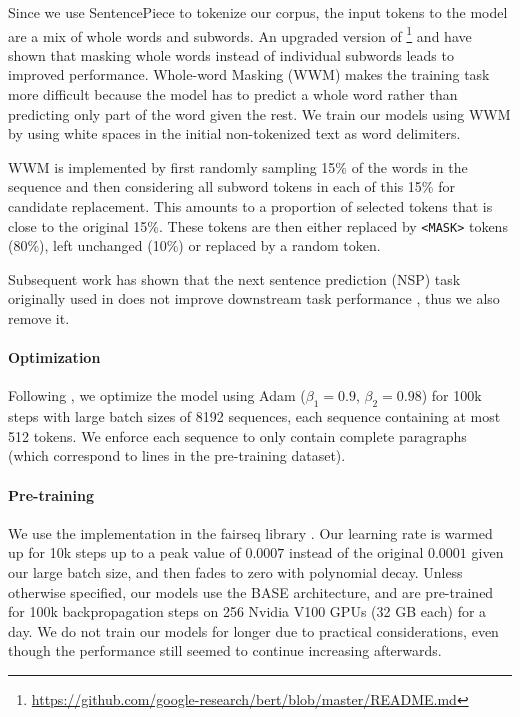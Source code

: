 Since we use SentencePiece to tokenize our corpus, the input tokens to the model are a mix of whole words and subwords. An upgraded version of \bert\footnote{\url{https://github.com/google-research/bert/blob/master/README.md}} and \citet{joshi-etal-2020-spanbert} have shown that masking whole words instead of individual subwords leads to improved performance. Whole-word Masking (WWM) makes the training task more difficult because the model has to predict a whole word rather than predicting only part of the word given the rest. We train our models using WWM by using white spaces in the initial non-tokenized text as word delimiters.

WWM is implemented by first randomly sampling 15\% of the words in the sequence and then considering all subword tokens in each of this 15\% for candidate replacement. This amounts to a proportion of selected tokens that is close to the original 15\%. These tokens are then either replaced by \texttt{<MASK>} tokens (80\%), left unchanged (10\%) or replaced by a random token.

Subsequent work has shown that the next sentence prediction (NSP) task originally used in \bert does not improve downstream task performance \citep{conneau-lample-2019-cross,liu-etal-2019-roberta}, thus we also remove it.

\paragraph{Optimization}
Following \citep{liu-etal-2019-roberta}, we optimize the model using Adam \citep{kingma-ba-2015-adam} ($\beta_1 = 0.9$, $\beta_2 = 0.98$) for 100k steps with large batch sizes of 8192 sequences, each sequence containing at most 512 tokens. We enforce each sequence to only contain complete paragraphs (which correspond to lines in the pre-training dataset).

\paragraph{Pre-training}
We use the \roberta implementation in the fairseq library \citep{ott-etal-2019-fairseq}. Our learning rate is warmed up for 10k steps up to a peak value of $0.0007$ instead of the original $0.0001$ given our large batch size, and then fades to zero with polynomial decay. Unless otherwise specified, our models use the BASE architecture, and are pre-trained for 100k backpropagation steps on 256 Nvidia V100 GPUs (32 GB each) for a day. We do not train our models for longer due to practical considerations, even though the performance still seemed to continue increasing afterwards.

